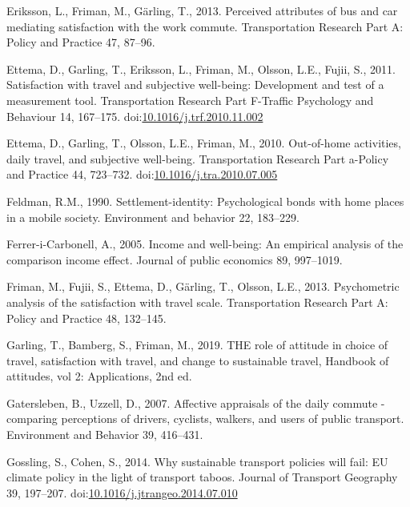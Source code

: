 \documentclass[]{elsarticle} %
\begin{document}
\leavevmode\hypertarget{ref-Eriksson2013perceived}{}%
Eriksson, L., Friman, M., Gärling, T., 2013. Perceived attributes of bus
and car mediating satisfaction with the work commute. Transportation
Research Part A: Policy and Practice 47, 87--96.

\leavevmode\hypertarget{ref-Ettema2011satisfaction}{}%
Ettema, D., Garling, T., Eriksson, L., Friman, M., Olsson, L.E., Fujii,
S., 2011. Satisfaction with travel and subjective well-being:
Development and test of a measurement tool. Transportation Research Part
F-Traffic Psychology and Behaviour 14, 167--175.
doi:\href{https://doi.org/10.1016/j.trf.2010.11.002}{10.1016/j.trf.2010.11.002}

\leavevmode\hypertarget{ref-Ettema2010out}{}%
Ettema, D., Garling, T., Olsson, L.E., Friman, M., 2010. Out-of-home
activities, daily travel, and subjective well-being. Transportation
Research Part a-Policy and Practice 44, 723--732.
doi:\href{https://doi.org/10.1016/j.tra.2010.07.005}{10.1016/j.tra.2010.07.005}

\leavevmode\hypertarget{ref-Feldman1990settlement}{}%
Feldman, R.M., 1990. Settlement-identity: Psychological bonds with home
places in a mobile society. Environment and behavior 22, 183--229.

\leavevmode\hypertarget{ref-Ferrer2005income}{}%
Ferrer-i-Carbonell, A., 2005. Income and well-being: An empirical
analysis of the comparison income effect. Journal of public economics
89, 997--1019.

\leavevmode\hypertarget{ref-Friman2013psychometric}{}%
Friman, M., Fujii, S., Ettema, D., Gärling, T., Olsson, L.E., 2013.
Psychometric analysis of the satisfaction with travel scale.
Transportation Research Part A: Policy and Practice 48, 132--145.

\leavevmode\hypertarget{ref-Garling2019role}{}%
Garling, T., Bamberg, S., Friman, M., 2019. THE role of attitude in
choice of travel, satisfaction with travel, and change to sustainable
travel, Handbook of attitudes, vol 2: Applications, 2nd ed.

\leavevmode\hypertarget{ref-Gatersleben2007affective}{}%
Gatersleben, B., Uzzell, D., 2007. Affective appraisals of the daily
commute - comparing perceptions of drivers, cyclists, walkers, and users
of public transport. Environment and Behavior 39, 416--431.

\leavevmode\hypertarget{ref-Gossling2014sustainable}{}%
Gossling, S., Cohen, S., 2014. Why sustainable transport policies will
fail: EU climate policy in the light of transport taboos. Journal of
Transport Geography 39, 197--207.
doi:\href{https://doi.org/10.1016/j.jtrangeo.2014.07.010}{10.1016/j.jtrangeo.2014.07.010}
\end{document}
